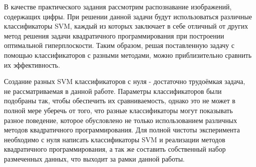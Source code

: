 
В качестве практического задания рассмотрим распознавание изображений, содержащих цифры. При решении данной задачи будут использоваться различные классификаторы SVM, каждый из которых заключает в себе отличный от других метод решения задачи квадратичного программирования при построении оптимальной гиперплоскости. Таким образом, решая поставленную задачу с помощью классификаторов с разными методами, можно приблизительно сравнить их эффективность. 

Создание разных SVM классификаторов с нуля - достаточно трудоёмкая задача, не рассматриваемая в данной работе. Параметры классификаторов были подобраны так, чтобы обеспечить их сравниваемость, однако это не может в полной мере уберечь от того, что разные классификаторы могут показывать разное поведение, которое обусловлено не только использованием различных методов квадратичного программирования. Для полной чистоты эксперимента необходимо с нуля написать классификаторы SVM и реализации методов квадратичного программирования, а так же составить собственный набор размеченных данных, что выходит за рамки данной работы.

